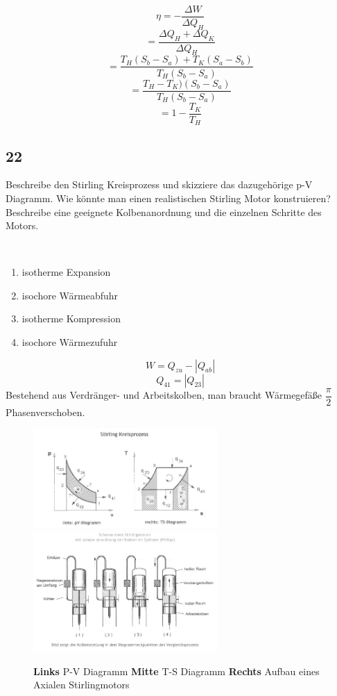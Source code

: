 \documentclass[12pt,a4paper]{report}
\newenvironment{myfrag}{\begin{it}}{\end{it}\vspace{3mm}\par}
\numberwithin{equation}{section}
\begin{document}
$$\eta = - \dfrac{\Delta W}{ \Delta Q_H}$$ 
$$ = \dfrac{\Delta Q_H + \Delta Q_K}{\Delta Q_H}$$ $$= \dfrac{T_H(S_b-S_a) + T_K(S_a -S_b)}{T_H(S_b-S_a)}$$ 
$$=\dfrac{T_H-T_K)(S_b-S_a)}{T_H(S_b-S_a)}$$ 
$$ = 1 -\dfrac{T_K}{T_H}$$


\subsection{22}
\begin{myfrag}
Beschreibe den Stirling Kreisprozess und skizziere das dazugehörige p-V
Diagramm. Wie könnte man einen realistischen Stirling Motor konstruieren?
Beschreibe eine geeignete Kolbenanordnung und die einzelnen Schritte des
Motors.
\end{myfrag}
\quad \\
\begin{enumerate}
\item isotherme Expansion
\item isochore Wärmeabfuhr
\item isotherme Kompression
\item isochore Wärmezufuhr
\end{enumerate}
$$ W = Q_{zu}-|Q_{ab}|$$
$$Q_{41} = |Q_{23}|$$
Bestehend aus Verdränger- und Arbeitskolben, man braucht Wärmegefäße $\dfrac{\pi}{2} $ Phasenverschoben.
\begin{figure}
\includegraphics[width=7cm]{Bilder/Frage22pv.jpg} 
\includegraphics[width=7cm]{Bilder/Frage22Aufbau.jpg} 

\caption{\textbf{Links} P-V Diagramm \textbf{Mitte} T-S Diagramm \textbf{Rechts} Aufbau eines Axialen Stirlingmotors}
\end{figure}
\end{document}
